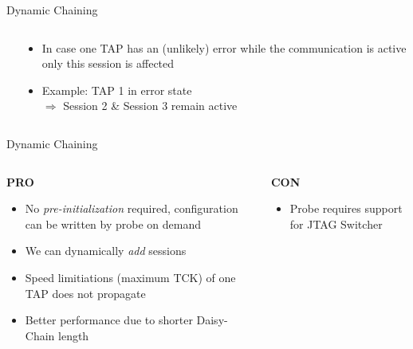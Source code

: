\documentclass[aspectratio=169,12pt]{beamer}
\begin{document}
\begin{frame}{Dynamic Chaining}
\begin{columns}[c]
\begin{column}{0.6\textwidth}

\end{column}
\begin{column}{0.4\textwidth}
\begin{itemize}
\item In case one TAP has an (unlikely) error while the communication is active only this session is affected
\item Example: TAP 1 in error state\\$\Rightarrow$ Session 2 \& Session 3 remain active
\end{itemize}
\end{column}
\end{columns}
\end{frame}

\begin{frame}{Dynamic Chaining}
\vspace{-2.5em}
\begin{columns}[t]
\begin{column}{0.5\textwidth}
\begin{center}\textbf{PRO}\end{center}
\begin{itemize}
\item No \emph{pre-initialization} required, configuration can be written by probe on demand
\item We can dynamically \emph{add} sessions
\item Speed limitiations (maximum TCK) of one TAP does not propagate
\item Better performance due to shorter Daisy-Chain length
\end{itemize}
\end{column}
\begin{column}{0.5\textwidth}
\begin{center}\textbf{CON}\end{center}
\begin{itemize}
\item Probe requires support for JTAG Switcher
\end{itemize}
\end{column}
\end{columns}
\end{frame}
\end{document}
